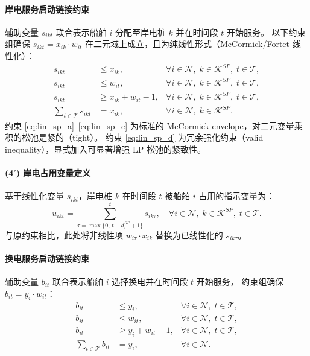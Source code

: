 \documentclass[UTF8, a4paper, 12pt]{ctexart}
\theoremstyle{plain}
\theoremstyle{definition}
\theoremstyle{remark}
\begin{document}
\paragraph{岸电服务启动链接约束}
辅助变量 $s_{ikt}$ 联合表示船舶 $i$ 分配至岸电桩 $k$ 并在时间段 $t$ 开始服务。
以下约束组确保 $s_{ikt} = x_{ik} \cdot w_{it}$ 在二元域上成立，且为纯线性形式（McCormick/Fortet 线性化）：
\begin{align}
s_{ikt} &\le x_{ik},
  & \forall i \in \mathcal{N},\; k \in \mathcal{K}^{SP},\; t \in \mathcal{T},
  \label{eq:lin_sp_a} \\
s_{ikt} &\le w_{it},
  & \forall i \in \mathcal{N},\; k \in \mathcal{K}^{SP},\; t \in \mathcal{T},
  \label{eq:lin_sp_b} \\
s_{ikt} &\ge x_{ik} + w_{it} - 1,
  & \forall i \in \mathcal{N},\; k \in \mathcal{K}^{SP},\; t \in \mathcal{T},
  \label{eq:lin_sp_c} \\
\sum_{t \in \mathcal{T}} s_{ikt} &= x_{ik},
  & \forall i \in \mathcal{N},\; k \in \mathcal{K}^{SP}.
  \label{eq:lin_sp_d}
\end{align}
约束 \eqref{eq:lin_sp_a}--\eqref{eq:lin_sp_c} 为标准的 McCormick envelope，对二元变量乘积的松弛是紧的（tight）。
约束 \eqref{eq:lin_sp_d} 为冗余强化约束（valid inequality），显式加入可显著增强 LP 松弛的紧致性。

\paragraph{(4$'$) 岸电占用变量定义}
基于线性化变量 $s_{ikt}$，岸电桩 $k$ 在时间段 $t$ 被船舶 $i$ 占用的指示变量为：
\begin{equation}
u_{ikt} = \sum_{\tau = \max\{0,\, t-d_i^{SP}+1\}}^{t} s_{ik\tau},
\quad \forall i \in \mathcal{N},\; k \in \mathcal{K}^{SP},\; t \in \mathcal{T}.
\label{eq:link_sp_24_final}
\end{equation}
与原约束相比，此处将非线性项 $w_{i\tau} \cdot x_{ik}$ 替换为已线性化的 $s_{ik\tau}$。

\paragraph{换电服务启动链接约束}
辅助变量 $b_{it}$ 联合表示船舶 $i$ 选择换电并在时间段 $t$ 开始服务，
约束组确保 $b_{it} = y_i \cdot w_{it}$：
\begin{align}
b_{it} &\le y_i,
  & \forall i \in \mathcal{N},\; t \in \mathcal{T},
  \label{eq:lin_bs_a} \\
b_{it} &\le w_{it},
  & \forall i \in \mathcal{N},\; t \in \mathcal{T},
  \label{eq:lin_bs_b} \\
b_{it} &\ge y_i + w_{it} - 1,
  & \forall i \in \mathcal{N},\; t \in \mathcal{T},
  \label{eq:lin_bs_c} \\
\sum_{t \in \mathcal{T}} b_{it} &= y_i,
  & \forall i \in \mathcal{N}.
  \label{eq:lin_bs_d}
\end{align}
\end{document}
